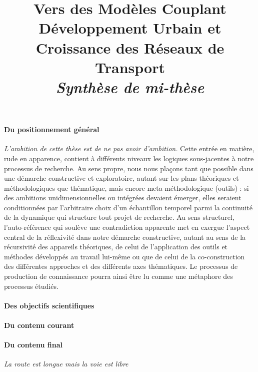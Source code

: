 


\title{Vers des Modèles Couplant Développement Urbain et Croissance des Réseaux de Transport\bigskip\\
\textit{Synthèse de mi-thèse}
}
\author{}
\date{}


\maketitle

\justify

\begin{abstract}
\end{abstract}


\paragraph{Du positionnement général}

\emph{L'ambition de cette thèse est de ne pas avoir d'ambition.} Cette entrée en matière, rude en apparence, contient à différents niveaux les logiques sous-jacentes à notre processus de recherche. Au sens propre, nous nous plaçons tant que possible dans une démarche constructive et exploratoire, autant sur les plans théoriques et méthodologiques que thématique, mais encore meta-méthodologique (outils) : si des ambitions unidimensionnelles ou intégrées devaient émerger, elles seraient conditionnées par l'arbitraire choix d'un échantillon temporel parmi la continuité de la dynamique qui structure tout projet de recherche. Au sens structurel, l'auto-référence qui soulève une contradiction apparente met en exergue l'aspect central de la réflexivité dans notre démarche constructive, autant au sens de la récursivité des appareils théoriques, de celui de l'application des outils et méthodes développés au travail lui-même ou que de celui de la co-construction des différentes approches et des différents axes thématiques. Le processus de production de connaissance pourra ainsi être lu comme une métaphore des processus étudiés.


\paragraph{Des objectifs scientifiques}





\paragraph{Du contenu courant}





\paragraph{Du contenu final}

\emph{La route est longue mais la voie est libre}













